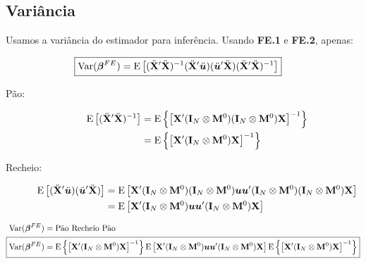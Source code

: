 \documentclass[11pt, oneside, a4paper, article]{article}
\numberwithin{equation}{section}
\begin{document}
\subsection{Variância}

Usamos a variância do estimador para inferência.
Usando \textbf{FE.1} e \textbf{FE.2}, apenas:

\vspace{-1 em}
\begin{align*} 
	\Aboxed{
\Var( \betavec^{FE} ) = 
\E \left[
	( \ddot{\Xmat}' \ddot{\Xmat} )^{-1}
	(\ddot{\Xmat}' \ddot{\uvec}) (\ddot{\uvec}' \ddot{\Xmat} )
	( \ddot{\Xmat}' \ddot{\Xmat} )^{-1} 
\right]}
\end{align*}


\begin{description}
\item [Pão:]
\begin{align*}
	\text{E}\left[ ( \ddot{\mathbf{X}}' \ddot{\mathbf{X}} )^{-1} \right] &=
\text{E} \left\{ \left[
\mathbf{X}' ( \mathbf{I}_{N} \otimes \mathbf{M}^{0} ) ( \mathbf{I}_{N} \otimes \mathbf{M}^{0} ) \mathbf{X}
\right]^{-1} \right\}
\\ &=
\text{E} \left\{ \left[
\mathbf{X}' ( \mathbf{I}_{N} \otimes \mathbf{M}^{0} ) \mathbf{X}
\right]^{-1} \right\}
\end{align*}

\item [Recheio:]
\begin{align*}
\text{E}\left[
	(\ddot{\mathbf{X}}' \ddot{\boldsymbol{u}}) (\ddot{\boldsymbol{u}}' \ddot{\mathbf{X}} ) 
\right] 
&=
\text{E} \left[
\mathbf{X}' ( \mathbf{I}_{N} \otimes \mathbf{M}^{0} ) ( \mathbf{I}_{N} \otimes \mathbf{M}^{0} ) 
\boldsymbol{u} \boldsymbol{u}'
( \mathbf{I}_{N} \otimes \mathbf{M}^{0} ) ( \mathbf{I}_{N} \otimes \mathbf{M}^{0} ) \mathbf{X}
\right]
\\ &=
\text{E} \left[
\mathbf{X}' ( \mathbf{I}_{N} \otimes \mathbf{M}^{0} ) \boldsymbol{u} \boldsymbol{u}' ( \mathbf{I}_{N} \otimes \mathbf{M}^{0} ) \mathbf{X}
\right]
\end{align*}
\end{description}

\vspace{-1 em}
\begin{align*} 
\Var( \betavec^{FE} ) &= \text{Pão Recheio Pão}
\\ 
\Aboxed{
\Var( \betavec^{FE} ) &= 
\E \left\{ \left[
\Xmat' ( \Imat_{N} \otimes \Mzero ) \Xmat
\right]^{-1} \right\}
\E \left[
\Xmat' ( \Imat_{N} \otimes \Mzero ) \uvec \uvec' ( \Imat_{N} \otimes \Mzero ) \Xmat
\right]
\E \left\{ \left[
\Xmat' ( \Imat_{N} \otimes \Mzero ) \Xmat
\right]^{-1} \right\}
}
\end{align*}
\end{document}
